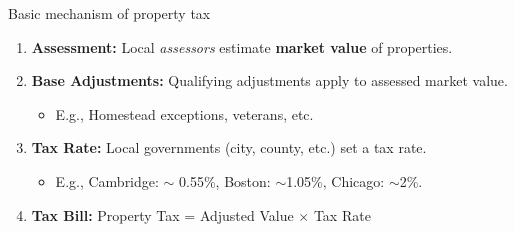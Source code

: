 \documentclass[aspectratio=169,12pt,]{beamer}
\newcommand{\1}{\mathbf{1}}
\begin{document}
\begin{frame}{Basic mechanism of property tax}

\begin{enumerate}
    \item \textbf{Assessment:} Local \textit{assessors} estimate \textbf{market value} of properties.
    \medskip

    \item \textbf{Base Adjustments:} Qualifying adjustments apply to assessed market value.
    \begin{itemize}
        \item E.g., Homestead exceptions, veterans, etc.
    \end{itemize}
    \medskip

    \item \textbf{Tax Rate:} Local governments (city, county, etc.) set a tax rate.
    \begin{itemize}
        \item E.g., Cambridge: $\sim$ 0.55\%, Boston: $\sim$1.05\%, Chicago: $\sim$2\%.
    \end{itemize}
    \medskip

    \item \textbf{Tax Bill:} Property Tax = Adjusted Value $\times$ Tax Rate
\end{enumerate}





\end{frame}
\end{document}
